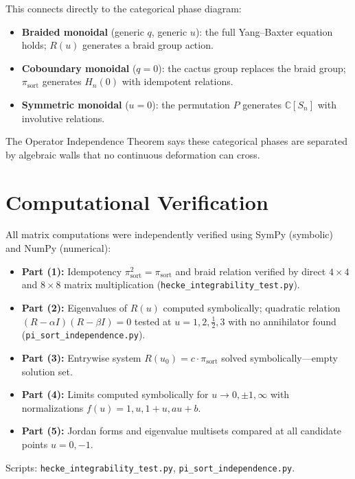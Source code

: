 \documentclass[11pt]{article}
\theoremstyle{remark}
\newcommand{\CC}{\mathbb{C}}
\newcommand{\pisort}{\pi_{\mathrm{sort}}}
\begin{document}
This connects directly to the categorical phase diagram:
\begin{itemize}
  \item \textbf{Braided monoidal} (generic $q$, generic $u$): the full
    Yang--Baxter equation holds; $R(u)$ generates a braid group action.
  \item \textbf{Coboundary monoidal} ($q = 0$): the cactus group
    replaces the braid group; $\pisort$ generates $H_n(0)$ with
    idempotent relations.
  \item \textbf{Symmetric monoidal} ($u = 0$): the permutation $P$
    generates $\CC[S_n]$ with involutive relations.
\end{itemize}
The Operator Independence Theorem says these categorical phases are
separated by algebraic walls that no continuous deformation can cross.

\section{Computational Verification}

All matrix computations were independently verified using SymPy
(symbolic) and NumPy (numerical):

\begin{itemize}
  \item \textbf{Part (1):} Idempotency $\pisort^2 = \pisort$ and braid
    relation verified by direct $4 \times 4$ and $8 \times 8$ matrix
    multiplication (\texttt{hecke\_integrability\_test.py}).
  \item \textbf{Part (2):} Eigenvalues of $R(u)$ computed symbolically;
    quadratic relation $(R-\alpha I)(R-\beta I) = 0$ tested at
    $u = 1, 2, \frac{1}{2}, 3$ with no annihilator found
    (\texttt{pi\_sort\_independence.py}).
  \item \textbf{Part (3):} Entrywise system $R(u_0) = c \cdot \pisort$
    solved symbolically---empty solution set.
  \item \textbf{Part (4):} Limits computed symbolically for
    $u \to 0, \pm 1, \infty$ with normalizations
    $f(u) = 1, u, 1+u, au+b$.
  \item \textbf{Part (5):} Jordan forms and eigenvalue multisets compared
    at all candidate points $u = 0, -1$.
\end{itemize}

\noindent
Scripts: \texttt{hecke\_integrability\_test.py},
\texttt{pi\_sort\_independence.py}.
\end{document}
